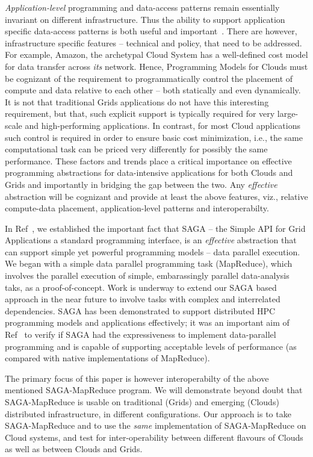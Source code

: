 \documentclass[conference,final]{IEEEtran}
\newcommand{\sagamapreduce }{SAGA-MapReduce }
\begin{document}
{\it Application-level} programming and data-access patterns remain
essentially invariant on different infrastructure. Thus the ability to
support application specific data-access patterns is both useful and
important~\cite{dpa-paper}.  There are however, infrastructure
specific features -- technical and policy, that need to be
addressed. For example, Amazon, the archetypal Cloud System has a
well-defined cost model for data transfer across {\it its}
network. Hence, Programming Models for Clouds must be cognizant of the
requirement to programmatically control the placement of compute and
data relative to each other -- both statically and even dynamically.
It is not that traditional Grids applications do not have this
interesting requirement, but that, such explicit support is typically
required for very large-scale and high-performing applications.  In
contrast, for most Cloud applications such control is required in
order to ensure basic cost minimization, i.e., the same computational
task can be priced very differently for possibly the same performance.
These factors and trends place a critical importance on effective
programming abstractions for data-intensive applications for both
Clouds and Grids and importantly in bridging the gap between the two.
Any {\it effective} abstraction will be cognizant and provide at least
the above features, viz., relative compute-data placement,
application-level patterns and interoperabilty.

In Ref~\cite{saga_ccgrid09}, we established the important fact that
SAGA -- the Simple API for Grid Applications a standard programming
interface, is an {\it effective} abstraction that can support simple
yet powerful programming models -- data parallel execution.  We began
with a simple data parallel programming task (MapReduce), which
involves the parallel execution of simple, embarassingly parallel
data-analysis taks, as a proof-of-concept.  Work is underway to extend
our SAGA based approach in the near future to involve tasks with
complex and interrelated dependencies. SAGA has been demonstrated to
support distributed HPC programming models and applications
effectively; it was an important aim of Ref~\cite{saga_ccgrid09} to
verify if SAGA had the expressiveness to implement data-parallel
programming and is capable of supporting acceptable levels of
performance (as compared with native implementations of MapReduce).

The primary focus of this paper is however interoperabilty of the
above mentioned \sagamapreduce program.  We will demonstrate beyond
doubt that \sagamapreduce is usable on traditional (Grids) and
emerging (Clouds) distributed infrastructure, in different
configurations. Our approach is to take \sagamapreduce and to use the
{\it same} implementation of \sagamapreduce on Cloud systems, and test
for inter-operability between different flavours of Clouds as well as
between Clouds and Grids.
\end{document}
